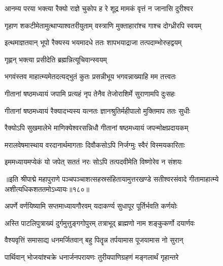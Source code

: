 \twolineshloka
{आनम्य परया भक्त्या रैक्यो राज्ञे चुकोप ह}
{रे शूद्र मामकं वृत्तं न जानासि दुरीश्वर} %

\twolineshloka
{गृहाण शकटीमेतामुत्थाप्याश्वतरीयुताम्}
{वस्त्राणि मुक्ताहारांश्च गाश्च दोग्ध्रीरपि स्वयम्} %

\twolineshloka
{इत्थमाज्ञतवान् भूपो रैक्यस्य भयमादधे}
{ततः शापभयाद्राजा तत्पदाम्भोरुहद्वयम्} %

\onelineshloka
{गृह्णन् भक्त्या प्रसीदेति ब्रह्मन्नित्यूचिवान्स्वयम्} %


\twolineshloka
{भगवंस्तव माहात्म्यमेतदत्यद्भुतं कुतः}
{प्रसन्नीभूय भगवन्नाख्याहि मम तत्त्वतः} %


\twolineshloka
{गीतानां षष्ठमध्यायं जपामि प्रत्यहं नृप}
{तेनैव तेजोराशिर्मे सुराणामपि दुःसहः} %

\twolineshloka
{गीतानां षष्ठमध्यायं रैक्यादभ्यस्य यत्नतः}
{ज्ञानश्रुतिर्महीपालो मुक्तिमाप ततः सुधीः} %

\twolineshloka
{रैक्योऽपि सुखमालेभे माणिक्येश्वरसन्निधौ}
{गीतानां षष्ठमध्यायं जपन्मोक्षप्रदायकम्} %

\twolineshloka
{मरालवेषमास्थाय वरदानार्थमागताः}
{दिवौकसोऽपि निर्जग्मुः स्वैरं विस्मयकारिताः} %

\twolineshloka
{इममध्यायमप्येकं यो जपेत् सततं नरः}
{सोऽपि तत्पदवीमेति विष्णोरेव न संशयः} %

॥इति श्रीपाद्मे महापुराणे पञ्चपञ्चाशत्सहस्रसंहितायामुत्तरखण्डे सतीश्वरसंवादे गीतामाहात्म्ये अशीत्यधिकशततमोऽध्यायः॥१८०॥

\genMangalaShloka

\closesub

\ganapatyadiDhyanam
\padmaPuranam



\twolineshloka
{अपर्णे वर्णयिष्यामि सप्तमाध्यायगौरवम्}
{यदाकर्ण्य सुधापूर पूर्तिर्भवति कर्णयोः} %

\twolineshloka
{अस्ति पाटलिपुत्राख्यं दुर्गमुत्तुङ्गगोपुरम्}
{तत्राभूद् ब्राह्मणो नाम शङ्कुकर्णो दयार्णवः} %

\twolineshloka
{वैश्यवृत्तिं समासाद्य धनमर्जितवान् बहु}
{पितॄन्न तर्पयामास पूजयामास नो सुरान्} %

\twolineshloka
{पार्थिवान् भोजयांश्चक्रे धनार्जनपरायणः}
{तुरीयपाणिग्रहणं मङ्गलार्थं गृहान्तरे} %

